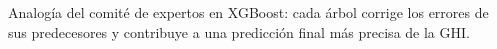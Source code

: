 \documentclass[letterpaper,12pt, twoside]{report}
\providecommand{\DIFdeltex}[1]{{\protect\color{red} \scriptsize #1}} %
\providecommand{\DIFdelFL}[1]{\DIFdel{#1}} %
\providecommand{\DIFdel}[1]{\texorpdfstring{\DIFdeltex{#1}}{}} %
\begin{document}
{%
\DIFdelFL{Analogía del comité de expertos en XGBoost: cada árbol corrige los errores de sus predecesores y contribuye a una predicción final más precisa de la GHI.}} %
\end{document}
